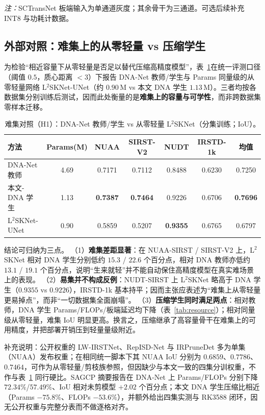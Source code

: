 \documentclass[lettersize,journal]{IEEEtran}
\begin{document}
\noindent\textit{注：}SCTransNet 板端输入为单通道灰度；其余骨干为三通道。可选后续补充 INT8 与功耗计数据。

\subsection{外部对照：难集上的从零轻量 vs 压缩学生}
\label{sec:h1_hard}

为检验“相近容量下从零轻量是否足以替代压缩高精度模型”，表~\ref{tab:h1_hard}在统一评测口径（阈值 $0.5$，质心距离 $<3$）下报告 DNA-Net 教师/学生与 Params 同量级的从零轻量网络 L$^2$SKNet-UNet\cite{L2SKNet2025}（约 $0.90$\,M vs 本文 DNA 学生 $1.13$\,M）。三者均按各数据集分别训练后测试，因而此处衡量的是\textbf{难集上的容量与可学性}，而非跨数据集零样本迁移。

\begin{table}[!t]
\caption{难集对照（H1）：DNA-Net 教师/学生 vs 从零轻量 L$^2$SKNet（分集训练；IoU）。}
\label{tab:h1_hard}
\centering
\footnotesize
\begin{tabular}{|l|c|c|c|c|c|c|}
\hline
方法 & Params(M) & NUAA & SIRST-V2 & NUDT & IRSTD-1k & 均值 \\
\hline
DNA-Net 教师 & 4.69 & 0.7171 & 0.7112 & 0.8488 & 0.6230 & 0.7250 \\
本文-DNA 学生 & 1.13 & \textbf{0.7387} & \textbf{0.7464} & 0.9226 & 0.6706 & \textbf{0.7696} \\
\hline
L$^2$SKNet-UNet & 0.90 & 0.5859 & 0.5207 & \textbf{0.9355} & 0.6765 & 0.6797 \\
\hline
\end{tabular}
\end{table}

结论可归纳为三点。
（1）\textbf{难集差距显著}：在 NUAA-SIRST / SIRST-V2 上，L$^2$SKNet 相对 DNA 学生分别低约 $15.3$ / $22.6$ 个百分点，相对 DNA 教师亦低约 $13.1$ / $19.1$ 个百分点，说明“生来就轻”并不能自动保住高精度模型在真实难场景上的表现。
（2）\textbf{易集并不构成反例}：NUDT-SIRST 上 L$^2$SKNet 略高于 DNA 学生（$0.9355$ vs $0.9226$），IRSTD-1k 基本持平；因而主张应表述为“难集上从零轻量更易掉点”，而非“一切数据集全面崩塌”。
（3）\textbf{压缩学生同时满足两点}：相对教师，DNA 学生 Params/FLOPs/板端延迟均下降（表~\ref{tab:resource}）；相对同量级从零轻量，难集 IoU 明显更高。换言之，压缩继承了高容量骨干在难集上的可用精度，并把部署开销压到轻量量级附近。

补充说明：公开权重的 LW-IRSTNet\cite{LWIRSTNet2023}、RepISD-Net\cite{RepISDNet2023} 与 IRPruneDet\cite{IRPruneDet2024} 多为单集（NUAA）发布权重；在相同统一脚本下其 NUAA IoU 分别为 $0.6859$、$0.7786$、$0.7464$，可作为从零轻量/剪枝族参照，但因缺少与本文一致的四集分训权重，不作与表~\ref{tab:h1_hard} 同行硬比。SAGCP\cite{SAGCP2025} 摘要报告在 DNA-Net 上 Params/FLOPs 分别下降 $72.34\%$/$57.49\%$、IoU 相对未剪模型 $+2.02$ 个百分点；本文 DNA 学生压缩比相近（Params $-75.8\%$、FLOPs $-53.6\%$），并额外给出四集实测与 RK3588 闭环，因无公开权重与完整分表而不做逐格对齐。
\end{document}
